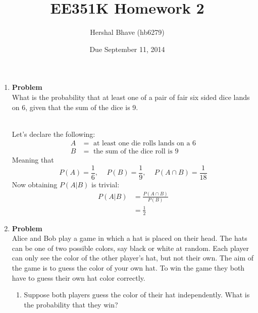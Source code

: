 \documentclass[12pt]{article}
\title{EE351K Homework 2}
\author{Hershal Bhave (hb6279)}
\date{Due September 11, 2014}
\newenvironment{Ex}{\textbf{Problem}\vspace{.75em}\\}{}
\begin{document}
\maketitle
\begin{enumerate}
\item
  \begin{Ex}
    What is the probability that at least one of a pair of fair six
    sided dice lands on 6, given that the sum of the dice is 9.
    \begin{solution} \hfill \vspace{0.75em} \\
      Let's declare the following:
      \begin{equation}
        \label{eq:1-var-declaration}
        \begin{aligned}
          A &= \text{ at least one die rolls lands on a }6 \\
          B &= \text{ the sum of the dice roll is }9
        \end{aligned}
      \end{equation}
      Meaning that
      \begin{equation}
        \label{eq:1-prob-declaration}
        P(A) = \frac{1}{6} \text{, } \quad
        P(B) = \frac{1}{9} \text{, } \quad
        P(A \cap B) = \frac{1}{18}
      \end{equation}
      Now obtaining $P(A | B)$ is trivial:
      \begin{equation}
        \label{eq:1-answer}
        \begin{aligned}
          P(A | B) &= \frac{P(A \cap B)}{P(B)} \\
          &= \frac{1}{2}
        \end{aligned}
      \end{equation}
    \end{solution}
  \end{Ex}
\item
  \begin{Ex}
    Alice and Bob play a game in which a hat is placed on their
    head. The hats can be one of two possible colors, say black or
    white at random. Each player can only see the color of the other
    player's hat, but not their own. The aim of the game is to guess
    the color of your own hat. To win the game they both have to guess
    their own hat color correctly.
    \begin{enumerate}
    \item Suppose both players guess the color of their hat
      independently. What is the probability that they win?

\end{enumerate}
\end{Ex}
\end{enumerate}
\end{document}
